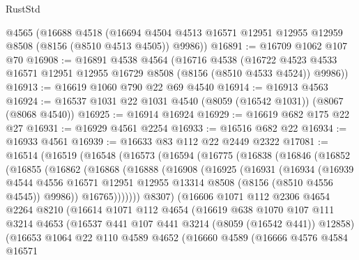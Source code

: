 \begin{lexlean}{RustStd}
\begin{coremodule}
    @4565
    (@16688
      @4518
      (@16694 @4504 @4513 @16571 @12951 @12955 @12959 @8508 (@8156 (@8510 @4513 @4505)) @9986))
@16891 := @16709 @1062 @107 @70
@16908 := @16891
    @4538
    @4564
    (@16716
      @4538
      (@16722 @4523 @4533 @16571 @12951 @12955 @16729 @8508 (@8156 (@8510 @4533 @4524)) @9986))
@16913 := @16619 @1060 @790 @22 @69 @4540
@16914 := @16913 @4563
@16924 := @16537 @1031 @22 @1031 @4540 (@8059 (@16542 @1031)) (@8067 (@8068 @4540))
@16925 := @16914 @16924
@16929 := @16619 @682 @175 @22 @27
@16931 := @16929 @4561 @2254
@16933 := @16516 @682 @22
@16934 := @16933 @4561
@16939 := @16633 @83 @112 @22 @2449 @2322
@17081 := @16514
    (@16519
      (@16548
        (@16573
          (@16594
            (@16775
              (@16838
                (@16846
                  (@16852
                    (@16855
                      (@16862
                        (@16868
                          (@16888
                            (@16908
                              (@16925
                                (@16931
                                  (@16934
                                    (@16939
                                      @4544
                                      @4556
                                      @16571
                                      @12951
                                      @12955
                                      @13314
                                      @8508
                                      (@8156 (@8510 @4556 @4545))
                                      @9986))
                                  @16765)))))))
                    @8307)
                  (@16606
                    @1071
                    @112
                    @2306
                    @4654
                    @2264
                    @8210
                    (@16614
                      @1071
                      @112
                      @4654
                      (@16619
                        @638
                        @1070
                        @107
                        @111
                        @3214
                        @4653
                        (@16537 @441 @107 @441 @3214 (@8059 (@16542 @441)) @12858)
                        (@16653
                          @1064
                          @22
                          @110
                          @4589
                          @4652
                          (@16660
                            @4589
                            (@16666
                              @4576
                              @4584
                              @16571

\end{coremodule}
\end{lexlean}
